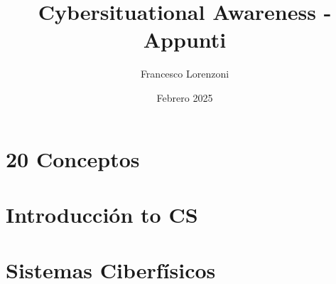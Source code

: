 


\title{Cybersituational Awareness - Appunti}
\author{Francesco Lorenzoni}
\date{Febrero 2025}


\makeatletter
\renewcommand{\l@section}{\@dottedtocline{1}{1.5em}{2.6em}}
\renewcommand{\l@subsection}{\@dottedtocline{2}{2.5em}{3.6em}}
\renewcommand{\l@subsubsection}{\@dottedtocline{3}{3.5em}{4.5em}}
\makeatother
{} %

% 
\usepackage{enumitem}


\doparttoc[n]

\maketitle
\tableofcontents

\part{20 Conceptos}

\part{Introducción to CS}
\parttoc





\part{Sistemas Ciberfísicos}
\parttoc




